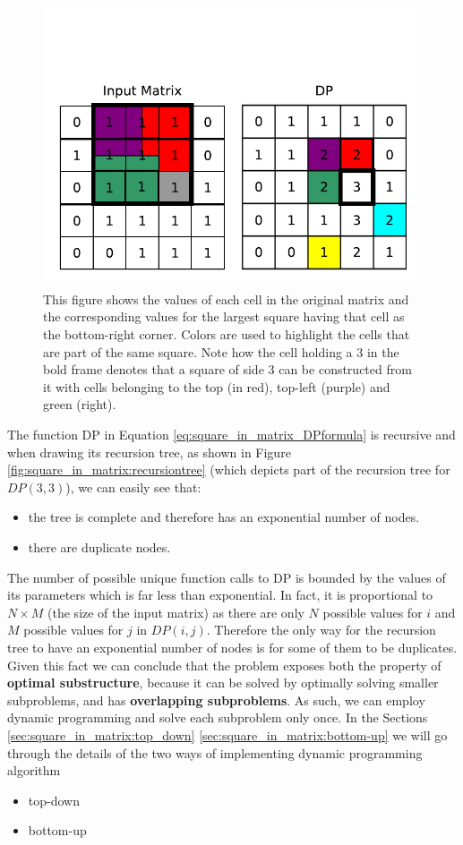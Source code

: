 \begin{figure}
	\centering
	\label{fig:square_in_matrix:square_DP_example}
	\includegraphics[]{sources/square_in_matrix/images/square_DP_example}
	\caption{This figure shows the values of each cell in the original matrix and the
	corresponding values for the largest square having that cell as the bottom-right corner. Colors are
	used to highlight the cells that are part of the same square. Note how the cell holding a $3$ in
	the bold frame denotes that a square of side $3$ can be constructed from it with cells belonging
	to the top (in red), top-left (purple) and green (right). }
\end{figure}

The function DP in Equation \ref{eq:square_in_matrix_DPformula} is recursive and when drawing its
recursion tree, as shown in Figure \ref{fig:square_in_matrix:recursiontree} (which depicts
part of the recursion tree for $DP(3,3)$),  we can easily see that:
\begin{itemize}
	\item the tree is complete and therefore has an exponential number of nodes.
	\item there are duplicate nodes.
\end{itemize} 
The number of possible unique function calls to DP is bounded by the values of its parameters which
is far less than exponential. In fact, it is proportional to $N \times M$ (the size of the input
matrix) as there are only $N$ possible values for $i$ and $M$ possible values for $j$ in $DP(i,j)$.
Therefore the only way for the recursion tree to have an exponential number of nodes is for some of
them to be duplicates. Given this fact we can conclude that the problem exposes both the property of
\textbf{optimal substructure}, because it can be solved by optimally solving smaller subproblems, and
has \textbf{overlapping subproblems}. As such,  we can employ dynamic programming and solve each
subproblem only once. In the Sections \ref{sec:square_in_matrix:top_down}
\ref{sec:square_in_matrix:bottom-up} we will go through the details of the two ways of implementing
dynamic programming algorithm
\begin{itemize}
	\item top-down 
	\item bottom-up
\end{itemize}

